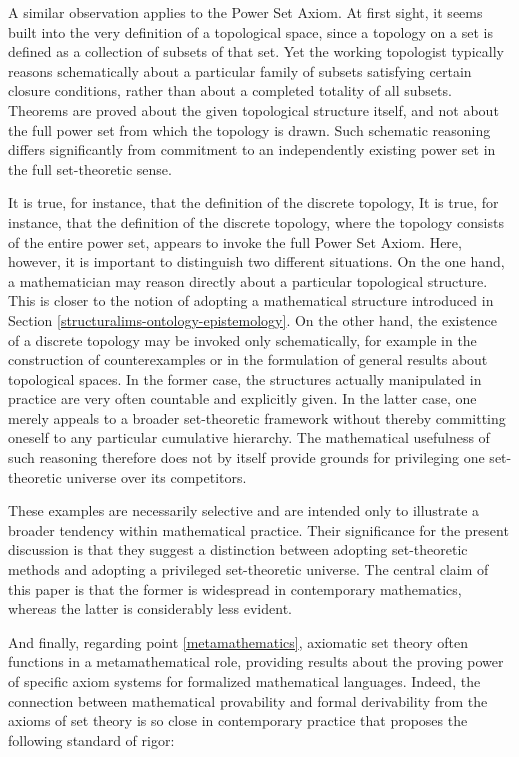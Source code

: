 \documentclass[11pt,a4paper]{book}
\theoremstyle{plain}
\begin{document}
A similar observation applies to the Power Set Axiom. At first sight, it seems built into the very definition of a topological space, since a topology on a set is defined as a collection of subsets of that set. Yet the working topologist typically reasons schematically about a particular family of subsets satisfying certain closure conditions, rather than about a completed totality of all subsets. Theorems are proved about the given topological structure itself, and not about the full power set from which the topology is drawn. Such schematic reasoning differs significantly from commitment to an independently existing power set in the full set-theoretic sense.

It is true, for instance, that the definition of the discrete topology, It is true, for instance, that the definition of the discrete topology, where the topology consists of the entire power set, appears to invoke the full Power Set Axiom. Here, however, it is important to distinguish two different situations. On the one hand, a mathematician may reason directly about a particular topological structure. This is closer to the notion of adopting a mathematical structure introduced in Section \ref{structuralims-ontology-epistemology}. On the other hand, the existence of a discrete topology may be invoked only schematically, for example in the construction of counterexamples or in the formulation of general results about topological spaces. In the former case, the structures actually manipulated in practice are very often countable and explicitly given. In the latter case, one merely appeals to a broader set-theoretic framework without thereby committing oneself to any particular cumulative hierarchy. The mathematical usefulness of such reasoning therefore does not by itself provide grounds for privileging one set-theoretic universe over its competitors.

These examples are necessarily selective and are intended only to illustrate a broader tendency within mathematical practice. Their significance for the present discussion is that they suggest a distinction between adopting set-theoretic methods and adopting a privileged set-theoretic universe. The central claim of this paper is that the former is widespread in contemporary mathematics, whereas the latter is considerably less evident.

And finally, regarding point \ref{metamathematics}, axiomatic set theory often functions in a metamathematical role, providing results about the proving power of specific axiom systems for formalized mathematical languages. Indeed, the connection between mathematical provability and formal derivability from the axioms of set theory is so close in contemporary practice that \textcite[373]{maclane1986mathematics} proposes the following standard of rigor:
\end{document}

